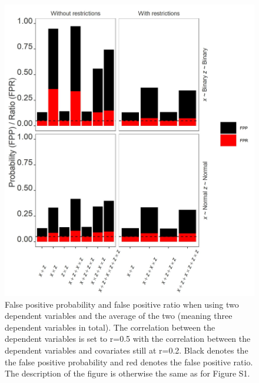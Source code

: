 \begin{figure}[hbt!]
\includegraphics{R/Analysis/Result/Figures/Figure3SI.jpeg}
\centering
\caption{False positive probability and false positive ratio when using two dependent variables and the average of the two (meaning three dependent variables in total). The correlation between the dependent variables is set to r=0.5 with the correlation between the dependent variables and covariates still at r=0.2. Black denotes the the false positive probability and red denotes the false positive ratio. The description of the figure is otherwise the same as for Figure S1.}
\label{fig:mainfigure}
\end{figure}


